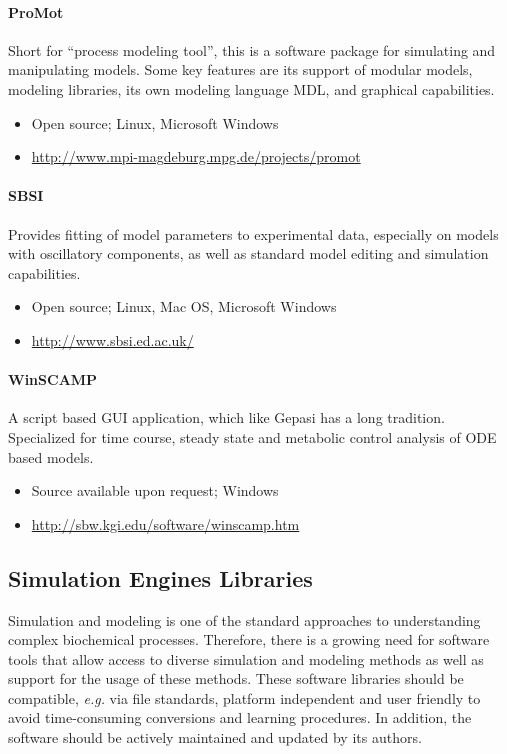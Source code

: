 \paragraph{ProMot \autocite{mirschel2009promot}}

Short for ``process modeling tool'', this is a software package for
simulating and manipulating models. Some key features are its support of
modular models, modeling libraries, its own modeling language MDL, and
graphical capabilities.

\begin{itemize}
\item
  Open source; Linux, Microsoft Windows
\item
  \url{http://www.mpi-magdeburg.mpg.de/projects/promot}
\end{itemize}
\paragraph{SBSI \autocite{adams2013sbsi}}

Provides fitting of model parameters to experimental data, especially on
models with oscillatory components, as well as standard model editing
and simulation capabilities.

\begin{itemize}
\item
  Open source; Linux, Mac OS, Microsoft Windows
\item
  \url{http://www.sbsi.ed.ac.uk/}
\end{itemize}
\paragraph{WinSCAMP \autocite{SauroF91} \autocite{SauroScamp93}}

A script based GUI application, which like Gepasi has a long tradition.
Specialized for time course, steady state and metabolic control analysis
of ODE based models.

\begin{itemize}
\item
  Source available upon request; Windows
\item
  \url{http://sbw.kgi.edu/software/winscamp.htm}
\end{itemize}
\subsection{Simulation Engines Libraries}

Simulation and modeling is one of the standard approaches to
understanding complex biochemical processes. Therefore, there is a
growing need for software tools that allow access to diverse simulation
and modeling methods as well as support for the usage of these methods.
These software libraries should be compatible, \emph{e.g.} via file
standards, platform independent and user friendly to avoid
time-consuming conversions and learning procedures. In addition, the
software should be actively maintained and updated by its authors.

